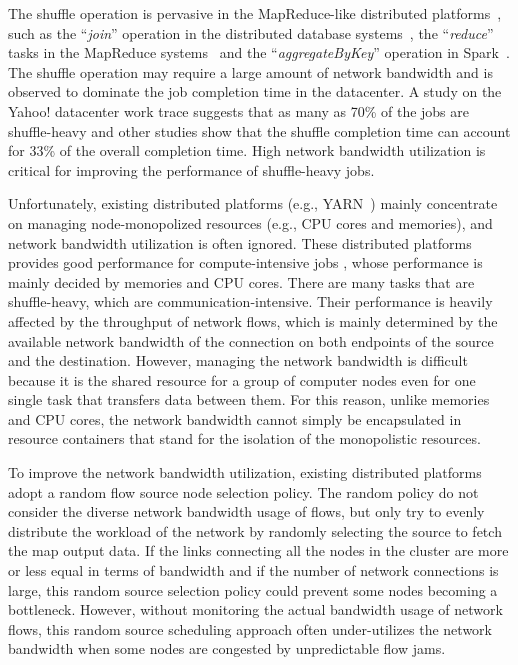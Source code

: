 \documentclass[10pt,journal,compsoc]{IEEEtran}
\begin{document}



 

The shuffle operation is pervasive in the MapReduce-like distributed platforms~\cite{dean2008mapreduce,hindman2011mesos}, 
such as the ``\emph{join}'' operation in the distributed database systems~\cite{thusoo2009hive, Yu:2008:DSG,Armbrust:2015:SSR}, 
the ``\emph{reduce}'' tasks in the MapReduce systems~\cite{dean2008mapreduce,vavilapalli2013apache}
and the ``\emph{aggregateByKey}'' operation in Spark~\cite{zaharia2012resilient}.
The shuffle operation may require a large amount of network bandwidth 
and is observed to dominate the job completion time in the datacenter.
A study on the Yahoo! datacenter work trace suggests that as many as 70\% of 
the jobs are shuffle-heavy and other studies show that the shuffle completion time
can account for 33\% of the overall completion time.
High network bandwidth utilization is critical for improving the performance of 
shuffle-heavy jobs.

Unfortunately, existing distributed platforms (e.g., YARN~\cite{vavilapalli2013apache}) mainly concentrate on
managing node-monopolized resources (e.g., CPU cores and memories),
and network bandwidth utilization is often ignored.  
These distributed platforms provides good performance for compute-intensive jobs , whose performance is mainly decided by
memories and CPU cores.
There are many tasks that are shuffle-heavy, which are communication-intensive.
Their performance is heavily 
affected by the throughput of network flows, which is
mainly determined by the available network bandwidth of
the connection on both endpoints of the source and the destination. 
However, managing the network bandwidth is difficult because it is the shared resource for a group of computer nodes even for one single task that transfers data between them. 
For this reason, unlike memories and CPU cores, the network bandwidth cannot simply be encapsulated in resource containers that stand for the isolation of the monopolistic resources.

To improve the network bandwidth utilization, existing distributed platforms~\cite{zaharia2012resilient,vavilapalli2013apache} adopt a random flow source node selection policy. 
The random policy do not consider the diverse network bandwidth usage of flows, but
only try to evenly distribute the workload of the network
by randomly selecting the source to fetch the map output data.
If the links connecting all the nodes in the cluster
are more or less equal in terms of bandwidth
and if the number of network connections is
large, this random source selection policy could prevent some nodes becoming a bottleneck.
However, 
without monitoring the actual bandwidth usage of network flows,
this random source scheduling approach often under-utilizes the network bandwidth when some nodes are congested by unpredictable flow jams. 
\end{document}

